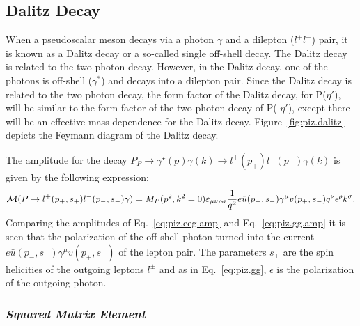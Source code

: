 \subsection{Dalitz Decay}\label{sec:dalitzdecay} 
When a pseudoscalar meson decays via a photon $\gamma$ and a dilepton ($l^{+}l^{-}$) pair, it is known as a Dalitz decay or a so-called single off-shell decay. The Dalitz decay is related to the two photon decay. However, in the Dalitz decay, one of the photons is off-shell ($\gamma^*$) and decays into a dilepton pair. Since the Dalitz decay is related to the two photon decay, the form factor of the Dalitz decay, for P($\eta'$), will be similar to the form factor of the two photon decay of P( $\eta'$), except there will be an effective mass dependence for the Dalitz decay. Figure~\ref{fig:piz.dalitz} depicts the Feymann diagram of the Dalitz decay.

The amplitude for the decay $P_P \to \gamma^\star(p) \gamma(k) \to l^+(p_+)l^-(p_-) \gamma(k)$ is given by the following expression:
\begin{equation}\label{eq:piz.eeg.amp}
{\cal M}(P\to l^+(p_+,s_+)l^-(p_-,s_-) \gamma) = {M}_P(p^2,k^2=0) \varepsilon_{\mu\nu\rho\sigma} \frac{1}{q^2} e \bar u(p_-,s_-) \gamma^\mu v(p_+,s_-) q^\nu \epsilon^\rho k^\sigma.
\end{equation}
Comparing the amplitudes of Eq.~\ref{eq:piz.eeg.amp} and Eq.~\ref{eq:piz.gg.amp} it is seen that the polarization of the off-shell photon turned into the current $e \bar u(p_-,s_-) \gamma^\mu v(p_+,s_-)$ of the lepton pair. The parameters $s_\pm$ are the spin helicities of the outgoing leptons $l^\pm$ and as in  Eq.~\ref{eq:piz.gg}, $\epsilon$ is the polarization of the outgoing photon. 
%
\subsubsection{\emph{Squared Matrix Element}}


